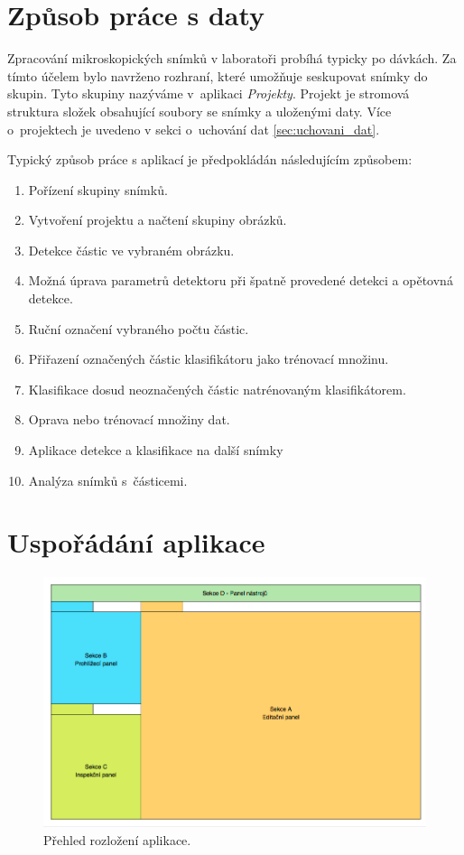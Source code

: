 \documentclass[11pt,twoside,a4paper,table]{book}
\begin{document}
\section{Způsob práce s daty}
Zpracování mikroskopických snímků v laboratoři probíhá typicky po dávkách. Za tímto účelem bylo navrženo rozhraní, které umožňuje seskupovat snímky do skupin. Tyto skupiny nazýváme v~aplikaci \textit{Projekty}. Projekt je stromová struktura složek obsahující soubory se snímky a uloženými daty. Více o~projektech je uvedeno v sekci o~uchování dat \ref{sec:uchovani_dat}.

Typický způsob práce s aplikací je předpokládán následujícím způsobem:
\begin{enumerate}
	\item Pořízení skupiny snímků.
	\item Vytvoření projektu a načtení skupiny obrázků.
	\item Detekce částic ve vybraném obrázku.
	\item Možná úprava parametrů detektoru při špatně provedené detekci a opětovná detekce.
	\item Ruční označení vybraného počtu částic.
	\item Přiřazení označených částic klasifikátoru jako trénovací množinu.
	\item Klasifikace dosud neoznačených částic natrénovaným klasifikátorem.
	\item Oprava nebo trénovací množiny dat.
	\item Aplikace detekce a klasifikace na další snímky 
	\item Analýza snímků s~částicemi.
\end{enumerate}

\section{Uspořádání aplikace}

\begin{figure}
\centering
\includegraphics[scale=0.5]{figures/app_overview.png}
\caption{Přehled rozložení aplikace.}
\label{fig:app_overview}
\end{figure}
\end{document}
